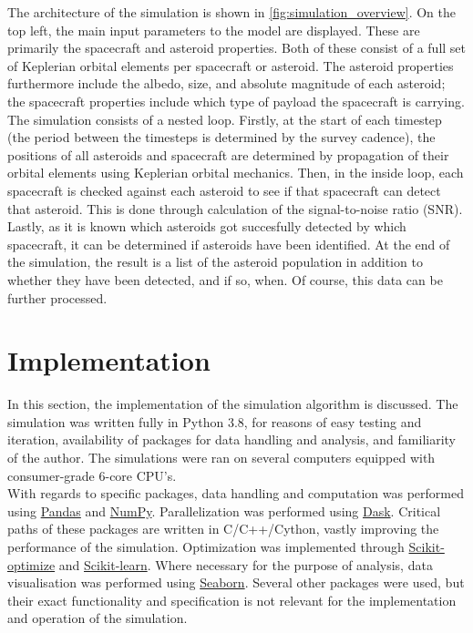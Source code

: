 The architecture of the simulation is shown in \autoref{fig:simulation_overview}. On the top left, the main input parameters to the model are displayed. These are primarily the spacecraft and asteroid properties. Both of these consist of a full set of Keplerian orbital elements per spacecraft or asteroid. The asteroid properties furthermore include the albedo, size, and absolute magnitude of each asteroid; the spacecraft properties include which type of payload the spacecraft is carrying. \\

The simulation consists of a nested loop. Firstly, at the start of each timestep (the period between the timesteps is determined by the survey cadence), the positions of all asteroids and spacecraft are determined by propagation of their orbital elements using Keplerian orbital mechanics. Then, in the inside loop, each spacecraft is checked against each asteroid to see if that spacecraft can detect that asteroid. This is done through calculation of the signal-to-noise ratio (SNR). Lastly, as it is known which asteroids got succesfully detected by which spacecraft, it can be determined if asteroids have been identified. At the end of the simulation, the result is a list of the asteroid population in addition to whether they have been detected, and if so, when. Of course, this data can be further processed.

\section{Implementation}
\label{sec:methodologyimplementation}
In this section, the implementation of the simulation algorithm is discussed. The simulation was written fully in Python 3.8, for reasons of easy testing and iteration, availability of packages for data handling and analysis, and familiarity of the author. The simulations were ran on several computers equipped with consumer-grade 6-core CPU's. \\

With regards to specific packages, data handling and computation was performed using \href{https://pandas.pydata.org}{Pandas} and \href{https://numpy.org}{NumPy}. Parallelization was performed using \href{https://dask.org}{Dask}. Critical paths of these packages are written in C/C++/Cython, vastly improving the performance of the simulation. Optimization was implemented through \href{https://pypi.org/project/scikit-optimize}{Scikit-optimize} and \href{https://scikit-learn.org/stable/index.html}{Scikit-learn}. Where necessary for the purpose of analysis, data visualisation was performed using \href{https://seaborn.pydata.org}{Seaborn}. Several other packages were used, but their exact functionality and specification is not relevant for the implementation and operation of the simulation.

